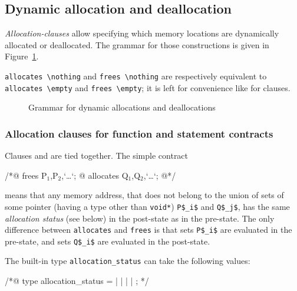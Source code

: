 \subsection{Dynamic allocation and deallocation}
\label{sec:allocation-clause}

\experimental

\textsl{Allocation-clauses} allow specifying which memory locations 
are dynamically allocated or deallocated.
The grammar for those constructions is given in Figure~\ref{fig:gram:allocation}.

\lstinline|allocates \nothing| and \lstinline|frees \nothing| are respectively 
equivalent to \lstinline|allocates \empty| and \lstinline|frees \empty|; 
it is left for convenience like for \assigns clauses.

\begin{figure}[t]
  \begin{cadre}
      
    \end{cadre}
  \caption{Grammar for dynamic allocations and deallocations}
\label{fig:gram:allocation}
\end{figure}

\subsubsection{Allocation clauses for function and statement contracts}
\label{subsec:allocation-contract}

Clauses \allocates and \frees are tied together. The simple contract  
\begin{listing-nonumber}
/*@ frees P$_1$,P$_2$,`\dots`;
  @ allocates Q$_1$,Q$_2$,`\dots`;
  @*/
\end{listing-nonumber}
means that any memory address, that does not belong to the union of sets of
some pointer (having a type other than \lstinline|void*|)
\lstinline|P$_i$| and \lstinline|Q$_j$|, has the same {\sl allocation status} 
(see below) in the post-state as in the pre-state. The only difference
between \lstinline|allocates| and \lstinline|frees| is that sets 
\lstinline|P$_i$| are evaluated 
in the pre-state, and sets \lstinline|Q$_i$| are evaluated in the post-state.

The built-in type \lstinline|allocation_status|
can take the following values:
\begin{notimplementedenv}
\begin{listing-nonumber}
/*@
type allocation_status = 
    \static | \register | \automatic | \dynamic | \unallocated;
*/
\end{listing-nonumber}
\end{notimplementedenv}

